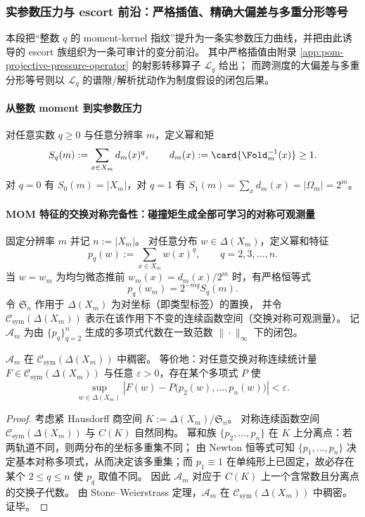 \subsubsection{实参数压力与 escort 前沿：严格插值、精确大偏差与多重分形等号}\label{subsubsec:pom-real-q-pressure-thermo-frontier}
本段把“整数 \(q\) 的 moment-kernel 指纹”提升为一条实参数压力曲线，并把由此诱导的 escort 族组织为一条可审计的变分前沿。
其中严格插值由附录 \ref{app:pom-projective-pressure-operator} 的射影转移算子 \(\mathcal{L}_q\) 给出；
而跨测度的大偏差与多重分形等号则以 \(\mathcal{L}_q\) 的谱隙/解析扰动作为制度假设的闭包后果。

\paragraph{从整数 moment 到实参数压力}
对任意实数 \(q\ge 0\) 与任意分辨率 \(m\)，定义幂和矩
\[
S_q(m):=\sum_{x\in X_m} d_m(x)^q,
\qquad
d_m(x):=\card{\Fold_m^{-1}(x)}\ge 1.
\]
对 \(q=0\) 有 \(S_0(m)=|X_m|\)，对 \(q=1\) 有 \(S_1(m)=\sum_x d_m(x)=|\Omega_m|=2^m\)。



\paragraph{MOM 特征的交换对称完备性：碰撞矩生成全部可学习的对称可观测量}
固定分辨率 \(m\) 并记 \(n:=|X_m|\)。
对任意分布 \(w\in\Delta(X_m)\)，定义幂和特征
\[
p_q(w):=\sum_{x\in X_m}w(x)^q,\qquad q=2,3,\dots,n.
\]
当 \(w=w_m\) 为均匀微态推前 \(w_m(x)=d_m(x)/2^m\) 时，有严格恒等式
\[
p_q(w_m)=2^{-mq}S_q(m).
\]
令 \(\mathfrak{S}_{n}\) 作用于 \(\Delta(X_m)\) 为对坐标（即类型标签）的置换，
并令 \(\mathcal{C}_{\mathrm{sym}}(\Delta(X_m))\) 表示在该作用下不变的连续函数空间（交换对称可观测量）。
记 \(\mathcal{A}_m\) 为由 \(\{p_q\}_{q=2}^{n}\) 生成的多项式代数在一致范数 \(\|\cdot\|_\infty\) 下的闭包。

\begin{theorem}\label{thm:pom-mom-symmetric-observables-stone-weierstrass}
\(\mathcal{A}_m\) 在 \(\mathcal{C}_{\mathrm{sym}}(\Delta(X_m))\) 中稠密。
等价地：对任意交换对称连续统计量 \(F\in \mathcal{C}_{\mathrm{sym}}(\Delta(X_m))\) 与任意 \(\varepsilon>0\)，存在某个多项式 \(P\) 使
\[
\sup_{w\in\Delta(X_m)}\left|F(w)-P\bigl(p_2(w),\dots,p_{n}(w)\bigr)\right|<\varepsilon.
\]
\end{theorem}
\begin{proof}
考虑紧 Hausdorff 商空间 \(K:=\Delta(X_m)/\mathfrak{S}_{n}\)。
对称连续函数空间 \(\mathcal{C}_{\mathrm{sym}}(\Delta(X_m))\) 与 \(C(K)\) 自然同构。
幂和族 \(\{p_2,\dots,p_n\}\) 在 \(K\) 上分离点：若两轨道不同，则两分布的坐标多重集不同；
由 Newton 恒等式可知 \(\{p_1,\dots,p_n\}\) 决定基本对称多项式，从而决定该多重集；而 \(p_1\equiv 1\) 在单纯形上已固定，故必存在某个 \(2\le q\le n\) 使 \(p_q\) 取值不同。
因此 \(\mathcal{A}_m\) 对应于 \(C(K)\) 上一个含常数且分离点的交换子代数。
由 Stone--Weierstrass 定理，\(\mathcal{A}_m\) 在 \(\mathcal{C}_{\mathrm{sym}}(\Delta(X_m))\) 中稠密。证毕。
\end{proof}

